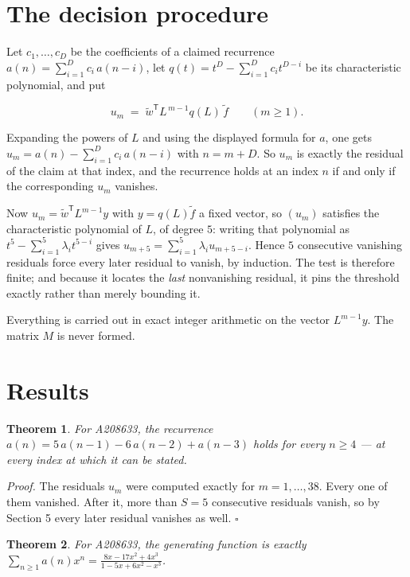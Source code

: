 \documentclass[11pt]{article}
\newtheorem{theorem}{Theorem}
\theoremstyle{definition}
\begin{document}
\section{The decision procedure}

Let $c_1,\dots,c_D$ be the coefficients of a claimed recurrence $a(n) = \sum_{i=1}^{D} c_i\,a(n-i)$, let $q(t) = t^{D} - \sum_{i=1}^{D} c_i t^{D-i}$ be its characteristic polynomial, and put

\[u_m \;=\; \tilde w^{\mathsf T} L^{\,m-1} q(L)\,\tilde f \qquad (m \ge 1).\]

Expanding the powers of $L$ and using the displayed formula for $a$, one gets $u_m = a(n) - \sum_{i=1}^{D} c_i\,a(n-i)$ with $n = m + D$. So $u_m$ is exactly the residual of the claim at that index, and the recurrence holds at an index $n$ if and only if the corresponding $u_m$ vanishes.

Now $u_m = \tilde w^{\mathsf T} L^{m-1} y$ with $y = q(L)\tilde f$ a fixed vector, so $(u_m)$ satisfies the characteristic polynomial of $L$, of degree $5$: writing that polynomial as $t^{5} - \sum_{i=1}^{5} \lambda_i t^{5-i}$ gives $u_{m+5} = \sum_{i=1}^{5} \lambda_i u_{m+5-i}$. Hence $5$ consecutive vanishing residuals force every later residual to vanish, by induction. The test is therefore finite; and because it locates the {\itshape last} nonvanishing residual, it pins the threshold exactly rather than merely bounding it.

Everything is carried out in exact integer arithmetic on the vector $L^{m-1}y$. The matrix $M$ is never formed.

\section{Results}

\begin{theorem} For A208633, the recurrence $a(n) = 5\,a(n-1) - 6\,a(n-2) + a(n-3)$ holds for every $n \ge 4$ --- at every index at which it can be stated.\end{theorem}

{\itshape Proof.} The residuals $u_m$ were computed exactly for $m = 1,\dots,38$. Every one of them vanished. After it, more than $S = 5$ consecutive residuals vanish, so by Section 5 every later residual vanishes as well. $\square$

\begin{theorem} For A208633, the generating function is exactly $\sum_{n\ge 1} a(n)x^n = \frac{8x - 17x^{2} + 4x^{3}}{1 - 5x + 6x^{2} - x^{3}}$.\end{theorem}
\end{document}
